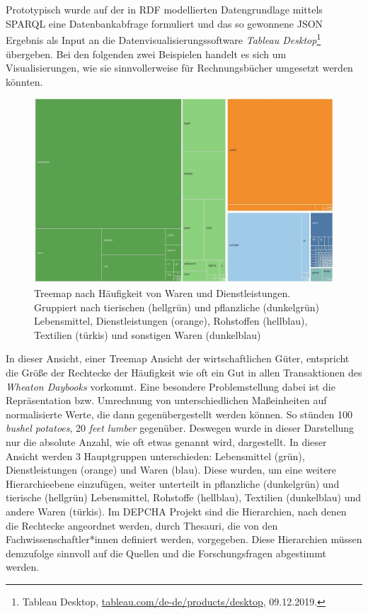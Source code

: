 \documentclass[12pt,a4paper]{article}
\begin{document}
\\
\\
Prototypisch wurde auf der in RDF modellierten Datengrundlage mittels SPARQL eine Datenbankabfrage formuliert und das so gewonnene JSON Ergebnis als Input an die Datenvisualisierungssoftware \textit{Tableau Desktop}\footnote{Tableau Desktop, \url{tableau.com/de-de/products/desktop}, 09.12.2019.} übergeben. Bei den folgenden zwei Beispielen handelt es sich um Visualisierungen, wie sie sinnvollerweise für Rechnungsbücher umgesetzt werden könnten.
\begin{figure}[H]
\centering
	\includegraphics[width=1\textwidth]{img/infovis1.jpg}  
    \caption[Treemap nach Häufigkeit von Waren und Dienstleistungen. Gruppiert nach tierischen (hellgrün) und pflanzliche (dunkelgrün) Lebensmittel, Dienstleistungen (orange), Rohstoffen (hellblau), Textilien (türkis) und sonstigen Waren (dunkelblau), eigene Darstellung, erstellt mit Tableau Desktop]{Treemap nach Häufigkeit von Waren und Dienstleistungen. Gruppiert nach tierischen (hellgrün) und pflanzliche (dunkelgrün) Lebensmittel, Dienstleistungen (orange), Rohstoffen (hellblau), Textilien (türkis) und sonstigen Waren (dunkelblau)} \label{fig:InfoVis1}
\end{figure}
In dieser Ansicht, einer Treemap Ansicht der wirtschaftlichen Güter, entspricht die Größe der Rechtecke der Häufigkeit wie oft ein Gut in allen Transaktionen des \textit{Wheaton Daybooks} vorkommt. Eine besondere Problemstellung dabei ist die Repräsentation bzw. Umrechnung von unterschiedlichen Maßeinheiten auf normalisierte Werte, die dann gegenübergestellt werden können. So stünden 100 \textit{bushel potatoes}, 20 \textit{feet lumber} gegenüber. Deswegen wurde in dieser Darstellung nur die absolute Anzahl, wie oft etwas genannt wird, dargestellt. In dieser Ansicht werden 3 Hauptgruppen unterschieden: Lebensmittel (grün), Dienstleistungen (orange) und Waren (blau). Diese wurden, um eine weitere Hierarchieebene einzufügen, weiter unterteilt in pflanzliche (dunkelgrün) und tierische (hellgrün) Lebensmittel, Rohstoffe (hellblau), Textilien (dunkelblau) und andere Waren (türkis). Im DEPCHA Projekt sind die Hierarchien, nach denen die Rechtecke angeordnet werden, durch Thesauri, die von den Fachwissenschaftler*innen definiert werden, vorgegeben. Diese Hierarchien müssen demzufolge sinnvoll auf die Quellen und die Forschungsfragen abgestimmt werden.
\end{document}
